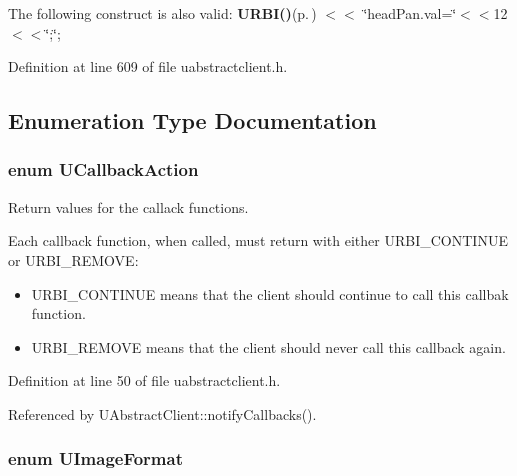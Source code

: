 The following construct is also valid: {\bf URBI()}{\rm (p.\,\pageref{uabstractclient_8h_a1})} $<$$<$ \char`\"{}head\-Pan.val=\char`\"{}$<$$<$12$<$$<$\char`\"{};\char`\"{}; 

Definition at line 609 of file uabstractclient.h.

\subsection{Enumeration Type Documentation}
\subsubsection{\setlength{\rightskip}{0pt plus 5cm}enum {\bf UCallback\-Action}}\label{uabstractclient_8h_a47}


Return values for the callack functions. 

Each callback function, when called, must return with either URBI\_\-CONTINUE or URBI\_\-REMOVE:\begin{itemize}
\item URBI\_\-CONTINUE means that the client should continue to call this callbak function.\item URBI\_\-REMOVE means that the client should never call this callback again. \end{itemize}


Definition at line 50 of file uabstractclient.h.

Referenced by UAbstract\-Client::notify\-Callbacks().
\subsubsection{\setlength{\rightskip}{0pt plus 5cm}enum {\bf UImage\-Format}}\label{uabstractclient_8h_a50}


